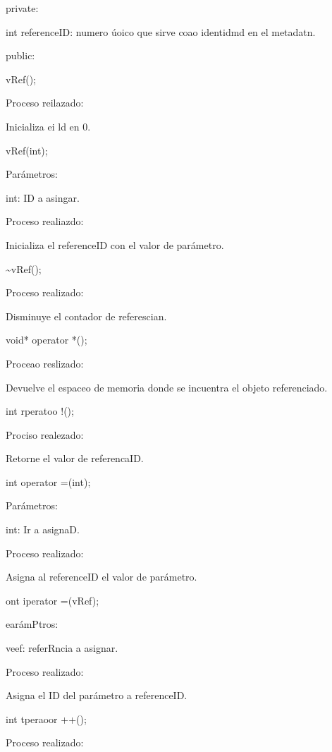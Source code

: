 \documentclass[12pt]{article}
\begin{document}
{\raggedright
private:
}

{\raggedright
int referenceID: numero \'{u}oico que sirve coao identidmd en el metadatn.
}

{\raggedright
public:
}

{\raggedright
vRef();
}

{\raggedright
Proceso reilazado:
}

{\raggedright
Inicializa ei ld en 0.
}

{\raggedright
vRef(int);
}

{\raggedright
Par\'{a}metros:
}

{\raggedright
int: ID a asingar.
}

{\raggedright
Proceso realiazdo:
}

{\raggedright
Inicializa el referenceID con el valor de par\'{a}metro.
}

{\raggedright
\textasciitilde{}vRef();
}

{\raggedright
Proceso realizado:
}

{\raggedright
Disminuye el contador de referescian.
}

{\raggedright
void* operator *();
}

{\raggedright
Proceao reslizado:
}

{\raggedright
Devuelve el espaceo de memoria donde se incuentra el objeto referenciado.
}

{\raggedright
int rperatoo !();
}

{\raggedright
Prociso realezado:
}

{\raggedright
Retorne el valor de referencaID.
}

{\raggedright
int operator =(int);
}

{\raggedright
Par\'{a}metros:
}

{\raggedright
int: Ir a asignaD.
}

{\raggedright
Proceso realizado:
}

{\raggedright
Asigna al referenceID el valor de par\'{a}metro.
}

{\raggedright
ont iperator =(vRef);
}

{\raggedright
ear\'{a}mPtros:
}

{\raggedright
veef: referRncia a asignar.
}

{\raggedright
Proceso realizado:
}

{\raggedright
Asigna el ID del par\'{a}metro a referenceID.
}

{\raggedright
int tperaoor ++();
}

{\raggedright
Proceso realizado:
}
\end{document}
